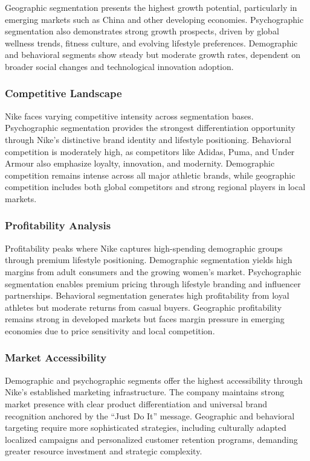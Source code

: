 \documentclass[letterpaper, 12pt]{article}
\begin{document}
Geographic segmentation presents the highest growth potential, particularly in emerging markets such as China and other developing economies. Psychographic segmentation also demonstrates strong growth prospects, driven by global wellness trends, fitness culture, and evolving lifestyle preferences. Demographic and behavioral segments show steady but moderate growth rates, dependent on broader social changes and technological innovation adoption.

\subsubsection{Competitive Landscape}

Nike faces varying competitive intensity across segmentation bases. Psychographic segmentation provides the strongest differentiation opportunity through Nike's distinctive brand identity and lifestyle positioning. Behavioral competition is moderately high, as competitors like Adidas, Puma, and Under Armour also emphasize loyalty, innovation, and modernity. Demographic competition remains intense across all major athletic brands, while geographic competition includes both global competitors and strong regional players in local markets.

\subsubsection{Profitability Analysis}

Profitability peaks where Nike captures high-spending demographic groups through premium lifestyle positioning. Demographic segmentation yields high margins from adult consumers and the growing women's market. Psychographic segmentation enables premium pricing through lifestyle branding and influencer partnerships. Behavioral segmentation generates high profitability from loyal athletes but moderate returns from casual buyers. Geographic profitability remains strong in developed markets but faces margin pressure in emerging economies due to price sensitivity and local competition.

\subsubsection{Market Accessibility}

Demographic and psychographic segments offer the highest accessibility through Nike's established marketing infrastructure. The company maintains strong market presence with clear product differentiation and universal brand recognition anchored by the ``Just Do It'' message. Geographic and behavioral targeting require more sophisticated strategies, including culturally adapted localized campaigns and personalized customer retention programs, demanding greater resource investment and strategic complexity.
\end{document}

